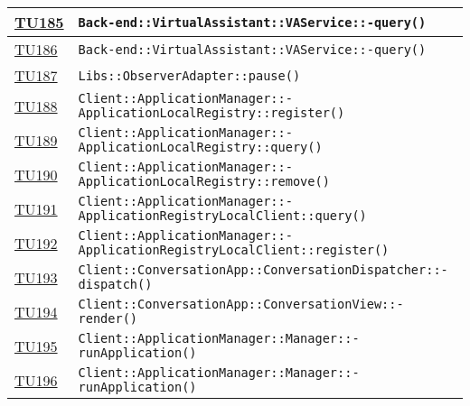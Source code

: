 \begin{longtable}{|>{\centering}m{1cm}|m{12cm}<{\centering}|}
\hyperlink{TU185}{TU185} & \texttt{Back-end::VirtualAssistant::VAService::-\linebreak query()}\\ \hline

\hyperlink{TU186}{TU186} & \texttt{Back-end::VirtualAssistant::VAService::-\linebreak query()}\\ \hline

\hyperlink{TU187}{TU187} & \texttt{Libs::ObserverAdapter::pause()}\\ \hline

\hyperlink{TU188}{TU188} & \texttt{Client::ApplicationManager::-\linebreak ApplicationLocalRegistry::register()}\\ \hline

\hyperlink{TU189}{TU189} & \texttt{Client::ApplicationManager::-\linebreak ApplicationLocalRegistry::query()}\\ \hline

\hyperlink{TU190}{TU190} & \texttt{Client::ApplicationManager::-\linebreak ApplicationLocalRegistry::remove()}\\ \hline

\hyperlink{TU191}{TU191} & \texttt{Client::ApplicationManager::-\linebreak ApplicationRegistryLocalClient::query()}\\ \hline

\hyperlink{TU192}{TU192} & \texttt{Client::ApplicationManager::-\linebreak ApplicationRegistryLocalClient::register()}\\ \hline

\hyperlink{TU193}{TU193} & \texttt{Client::ConversationApp::ConversationDispatcher::-\linebreak dispatch()}\\ \hline

\hyperlink{TU194}{TU194} & \texttt{Client::ConversationApp::ConversationView::-\linebreak render()}\\ \hline

\hyperlink{TU195}{TU195} & \texttt{Client::ApplicationManager::Manager::-\linebreak runApplication()}\\ \hline

\hyperlink{TU196}{TU196} & \texttt{Client::ApplicationManager::Manager::-\linebreak runApplication()}\\ \hline


\end{longtable}
